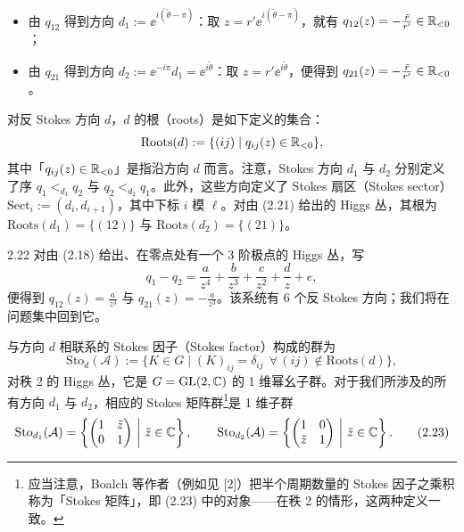 \begin{itemize}[leftmargin=1.4em,itemsep=1pt,topsep=1pt]
\item 由 $q_{12}$ 得到方向 $d_1:=\ee^{i(\tilde{\theta}-\pi)}$：取 $z=r'\ee^{i(\tilde{\theta}-\pi)}$，就有 $q_{12}(z)=-\frac{\tilde{r}}{r'}\in\mathbb{R}_{<0}$；
\item 由 $q_{21}$ 得到方向 $d_2:=\ee^{-i\pi}d_1=\ee^{i\tilde{\theta}}$：取 $z=r'\ee^{i\tilde{\theta}}$，便得到 $q_{21}(z)=-\frac{\tilde{r}}{r'}\in\mathbb{R}_{<0}$。
\end{itemize}

对反 Stokes 方向 $d$，$d$ 的根（roots）是如下定义的集合：
\[
\mathrm{Roots}(d):=\{(ij)\mid q_{ij}(z)\in\mathbb{R}_{<0}\},
\]
其中「$q_{ij}(z)\in\mathbb{R}_{<0}$」是指沿方向 $d$ 而言。注意，Stokes 方向 $d_1$ 与 $d_2$ 分别定义了序 $q_1<_{d_1}q_2$ 与 $q_2<_{d_2}q_1$。此外，这些方向定义了 Stokes 扇区（Stokes sector）$\mathrm{Sect}_i:=(d_i,d_{i+1})$，其中下标 $i$ 模 $\ell$。对由 (2.21) 给出的 Higgs 丛，其根为 $\mathrm{Roots}(d_1)=\{(12)\}$ 与 $\mathrm{Roots}(d_2)=\{(21)\}$。



\begin{rem}{2.22} 对由 (2.18) 给出、在零点处有一个 3 阶极点的 Higgs 丛，写
\[
q_1-q_2=\frac{a}{z^{4}}+\frac{b}{z^{3}}+\frac{c}{z^{2}}+\frac{d}{z}+e,
\]
便得到 $q_{12}(z)=\frac{a}{z^{3}}$ 与 $q_{21}(z)=-\frac{a}{z^{3}}$。该系统有 6 个反 Stokes 方向；我们将在问题集中回到它。\end{rem}


与方向 $d$ 相联系的 Stokes 因子（Stokes factor）构成的群为
\[
\mathrm{Sto}_d(\mathcal{A}):=\{K\in G\mid (K)_{ij}=\delta_{ij}\ \ \forall\,(ij)\notin\mathrm{Roots}(d)\},
\]
对秩 2 的 Higgs 丛，它是 $G=\mathrm{GL}(2,\mathbb{C})$ 的 1 维幂幺子群。对于我们所涉及的所有方向 $d_1$ 与 $d_2$，相应的 Stokes 矩阵群\footnote{应当注意，Boalch 等作者（例如见 [2]）把半个周期数量的 Stokes 因子之乘积称为「Stokes 矩阵」，即 (2.23) 中的对象——在秩 2 的情形，这两种定义一致。}是 1 维子群
\begin{equation}
\mathrm{Sto}_{d_1}(\mathcal{A})=\left\{\begin{pmatrix}1&\tilde{z}\\ 0&1\end{pmatrix}\ \middle|\ \tilde{z}\in\mathbb{C}\right\},
\qquad
\mathrm{Sto}_{d_2}(\mathcal{A})=\left\{\begin{pmatrix}1&0\\ \tilde{z}&1\end{pmatrix}\ \middle|\ \tilde{z}\in\mathbb{C}\right\}. \tag{2.23}
\end{equation}

